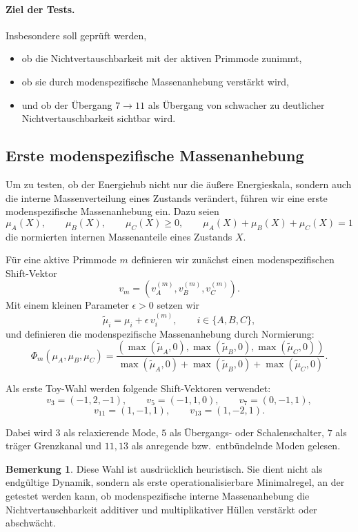 \documentclass[11pt,a4paper]{article}
\theoremstyle{definition}
\newtheorem{bemerkung}{Bemerkung}
\begin{document}
\paragraph{Ziel der Tests.}
Insbesondere soll geprüft werden,
\begin{itemize}
	\item ob die Nichtvertauschbarkeit mit der aktiven Primmode zunimmt,
	\item ob sie durch modenspezifische Massenanhebung verstärkt wird,
	\item und ob der Übergang \(7\to 11\) als Übergang von schwacher zu deutlicher Nichtvertauschbarkeit sichtbar wird.
\end{itemize}
\subsection{Erste modenspezifische Massenanhebung}

Um zu testen, ob der Energiehub nicht nur die äußere Energieskala, sondern auch die interne Massenverteilung eines Zustands verändert, führen wir eine erste modenspezifische Massenanhebung ein. Dazu seien
\[
\mu_A(X),\qquad \mu_B(X),\qquad \mu_C(X)\ge 0,
\qquad
\mu_A(X)+\mu_B(X)+\mu_C(X)=1
\]
die normierten internen Massenanteile eines Zustands \(X\).

Für eine aktive Primmode \(m\) definieren wir zunächst einen modenspezifischen Shift-Vektor
\[
v_m=(v_A^{(m)},v_B^{(m)},v_C^{(m)}).
\]
Mit einem kleinen Parameter \(\epsilon>0\) setzen wir
\[
\widetilde\mu_i=\mu_i+\epsilon\, v_i^{(m)},
\qquad i\in\{A,B,C\},
\]
und definieren die modenspezifische Massenanhebung durch Normierung:
\[
\Phi_m(\mu_A,\mu_B,\mu_C)
=
\frac{(\max(\widetilde\mu_A,0),\max(\widetilde\mu_B,0),\max(\widetilde\mu_C,0))}
{\max(\widetilde\mu_A,0)+\max(\widetilde\mu_B,0)+\max(\widetilde\mu_C,0)}.
\]

Als erste Toy-Wahl werden folgende Shift-Vektoren verwendet:
\[
v_3=(-1,2,-1),\qquad
v_5=(-1,1,0),\qquad
v_7=(0,-1,1),
\]
\[
v_{11}=(1,-1,1),\qquad
v_{13}=(1,-2,1).
\]

Dabei wird \(3\) als relaxierende Mode, \(5\) als Übergangs- oder Schalenschalter, \(7\) als träger Grenzkanal und \(11,13\) als anregende bzw.\ entbündelnde Moden gelesen.
\begin{bemerkung}
	Diese Wahl ist ausdrücklich heuristisch. Sie dient nicht als endgültige Dynamik, sondern als erste operationalisierbare Minimalregel, an der getestet werden kann, ob modenspezifische interne Massenanhebung die Nichtvertauschbarkeit additiver und multiplikativer Hüllen verstärkt oder abschwächt.
\end{bemerkung}
\end{document}
